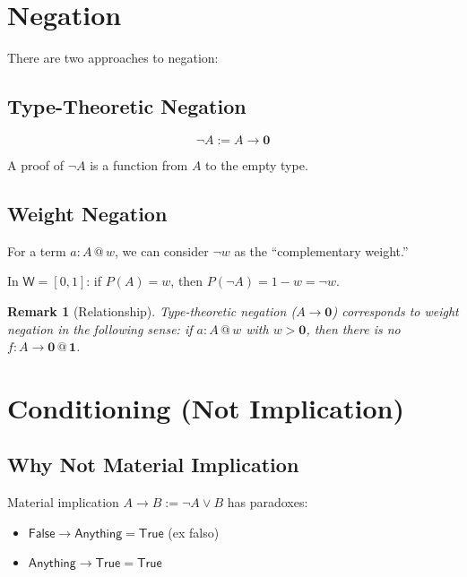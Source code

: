 \documentclass[11pt,a4paper]{article}
\makeatletter
\newtheorem{remark}{Remark}[section]
\newcommand{\W}{\mathsf{W}}
\newcommand{\at}[1]{\,@\,#1}
\newcommand{\one}{\mathbf{1}}
\newcommand{\zero}{\mathbf{0}}
\newcommand{\negw}{\neg}
\makeatother
\begin{document}
\section{Negation}

There are two approaches to negation:

\subsection{Type-Theoretic Negation}

\[
\neg A := A \to \mathbf{0}
\]

A proof of $\neg A$ is a function from $A$ to the empty type.

\subsection{Weight Negation}

For a term $a : A \at{w}$, we can consider $\negw w$ as the ``complementary weight.''

In $\W = {[0,1]}$: if $P(A) = w$, then $P(\neg A) = 1 - w = \negw w$.

\begin{remark}[Relationship]
Type-theoretic negation ($A \to \mathbf{0}$) corresponds to weight negation in the following sense: if $a : A \at{w}$ with $w > \zero$, then there is no $f : A \to \mathbf{0} \at{\one}$.
\end{remark}

\section{Conditioning (Not Implication)}

\subsection{Why Not Material Implication}

Material implication $A \to B := \negw A \vee B$ has paradoxes:
\begin{itemize}
    \item $\mathsf{False} \to \mathsf{Anything} = \mathsf{True}$ (ex falso)
    \item $\mathsf{Anything} \to \mathsf{True} = \mathsf{True}$
\end{itemize}
\end{document}
